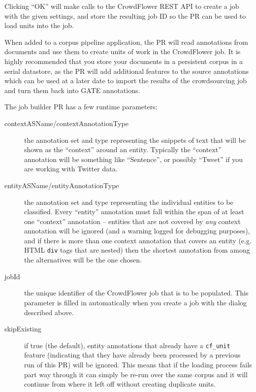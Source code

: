 Clicking ``OK'' will make calls to the CrowdFlower REST API to create a job
with the given settings, and store the resulting job ID so the PR can be used
to load units into the job.


When added to a corpus pipeline application, the PR will read annotations from
documents and use them to create units of work in the CrowdFlower job.  It is
highly recommended that you store your documents in a persistent corpus in a
serial datastore, as the PR will add additional features to the source
annotations which can be used at a later date to import the results of the
crowdsourcing job and turn them back into GATE annotations.

The job builder PR has a few runtime parameters:
\begin{description}
\item[contextASName/contextAnnotationType] the annotation set and type
  representing the snippets of text that will be shown as the ``context''
  around an entity.  Typically the ``context'' annotation will be something
  like ``Sentence'', or possibly ``Tweet'' if you are working with Twitter
  data.
\item[entityASName/entityAnnotationType] the annotation set and type
  representing the individual entities to be classified.  Every ``entity''
  annotation must fall within the span of at least one ``context'' annotation --
  entities that are not covered by \emph{any} context annotation will be
  ignored (and a warning logged for debugging purposes), and if there is more
  than one context annotation that covers an entity (e.g. HTML \verb!div! tags
  that are nested) then the shortest annotation from among the alternatives
  will be the one chosen.
\item[jobId] the unique identifier of the CrowdFlower job that is to be
  populated.  This parameter is filled in automatically when you create a job
  with the dialog described above.
\item[skipExisting] if true (the default), entity annotations that already have
  a \verb!cf_unit! feature (indicating that they have already been processed by a
  previous run of this PR) will be ignored.  This means that if the loading
  process fails part way through it can simply be re-run over the same corpus
  and it will continue from where it left off without creating duplicate units.
\end{description}

